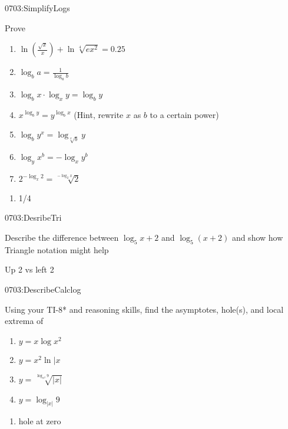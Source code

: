 \begin{defproblem}{0703:SimplifyLogs}
\begin{onlyproblem}
Prove
\begin{enumerate}
\item $\ln{\left(\frac{\sqrt{x}}{x}\right)} + \ln{\sqrt[4]{ex^2}}=0.25$
\item $\log_b{a} = \frac{1}{\log_a{b}}$
\item $\log_b{x} \cdot{} \log_x{y} = \log_b{y}$
\item $x^{\log_b{y}} = y^{\log_b{x}}$  (Hint, rewrite $x$ as $b$ to a certain power)
\item $\log_b{y^x} = \log_{\sqrt[x]{b}}{y}$
\item $\log_y{x^b} = -\log_x{y^b}$
\item $2^{-\log_x{2}} = \sqrt[-\log_2{x}]{2}$
\end{enumerate}
\end{onlyproblem}
\begin{onlysolution}
\begin{enumerate}
\item 1/4
\end{enumerate}
\end{onlysolution}
\end{defproblem}


\begin{defproblem}{0703:DesribeTri}
\begin{onlyproblem}
Describe the difference between $\log_5{x} + 2$ and $\log_5{(x+2)}$
and show how Triangle notation might help
\end{onlyproblem}
\begin{onlysolution}
Up 2 vs left 2
\end{onlysolution}
\end{defproblem}

\begin{defproblem}{0703:DescribeCalclog}
\begin{onlyproblem}
Using your TI-8* and reasoning skills, find the asymptotes,
hole(s), and local extrema of 
\begin{enumerate}
\item $y=x\log{x^2}$
\item $y=x^2\ln{|x}$
\item $y=\sqrt[\log_{x^2}{9}]{|x|}$
\item $y=\log_{|x|}{9}$
\end {enumerate}
\end{onlyproblem}
\begin{onlysolution}
\begin{enumerate}
\item hole at zero
\end{enumerate}
\end{onlysolution}
\end{defproblem}





\endinput

